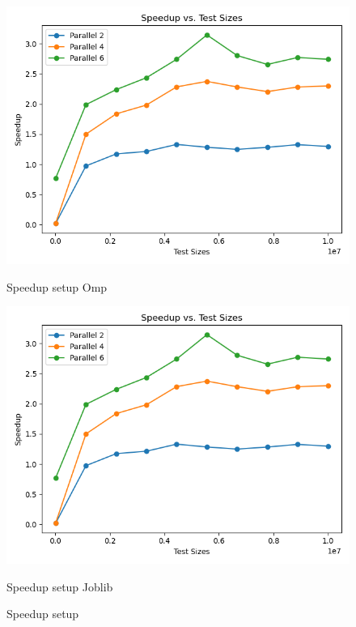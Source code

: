 \documentclass[11pt]{article}
\begin{document}
    \begin{figure}[H]
        \centering
        \includegraphics[width=\linewidth]{plot_setup_speedup}
            \caption{Speedup setup Omp}\label{fig:setup_speedup_omp}
        \endminipage\hfill
        \includegraphics[width=\linewidth]{plot_setup_speedup}
            \caption{Speedup setup Joblib}\label{fig:setup_speedup_joblib}
        \endminipage\hfill
        \caption{Speedup setup}
    \end{figure}
\end{document}
